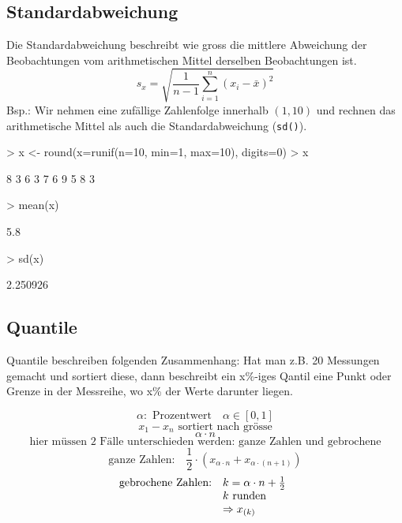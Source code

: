 \subsection{Standardabweichung}
Die Standardabweichung beschreibt wie gross die mittlere Abweichung der
Beobachtungen vom arithmetischen Mittel derselben Beobachtungen ist.
\[ s_x = \sqrt{ \frac{1}{n-1} \sum\limits_{i=1}^{n} (x_i - \bar{x})^2 } \]
Bsp.: Wir nehmen eine zufällige Zahlenfolge innerhalb $(1,10)$ und
rechnen das arithmetische Mittel als auch die Standardabweichung (\verb!sd()!).
\begin{Schunk}
\begin{Sinput}
> x <- round(x=runif(n=10, min=1, max=10), digits=0)
> x
\end{Sinput}
\begin{Soutput}
 [1] 8 3 6 3 7 6 9 5 8 3
\end{Soutput}
\begin{Sinput}
> mean(x)
\end{Sinput}
\begin{Soutput}
[1] 5.8
\end{Soutput}
\begin{Sinput}
> sd(x)
\end{Sinput}
\begin{Soutput}
[1] 2.250926
\end{Soutput}
\end{Schunk}

\subsection{Quantile}
Quantile beschreiben folgenden Zusammenhang: Hat man z.B. 20 Messungen gemacht
und sortiert diese, dann beschreibt ein x\%-iges Qantil eine Punkt oder Grenze
in der Messreihe, wo x\% der Werte darunter liegen.

\[ \alpha: \text{ Prozentwert} \quad \alpha \in [0,1] \]
\[ x_1 - x_n \text{ sortiert nach grösse}  \]
\[ \alpha \cdot n \]
\[ \text{hier müssen 2 Fälle unterschieden werden: ganze Zahlen und gebrochene} \]
\[ \text{ganze Zahlen:} \quad \frac{1}{2} 
\cdot (x_{\alpha \cdot n} + x_{\alpha \cdot (n+1)}) \]
\[ \begin{array}{@{}@{}ll}
	\text{gebrochene Zahlen:} & k=\alpha \cdot n + \frac{1}{2} \\
	                          & k \text{ runden} \\
				  & \Rightarrow x_{(k)}
\end{array}\]

